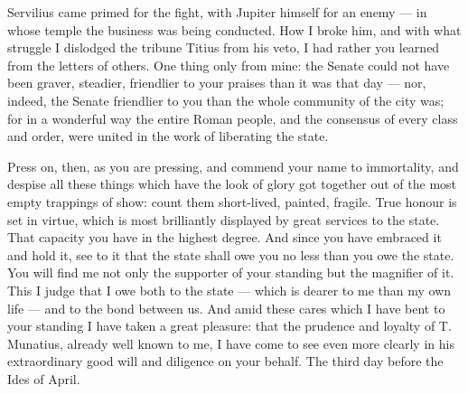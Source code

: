  Servilius came primed for the fight, with Jupiter himself for an enemy --- in whose temple the business was being conducted. How I broke him, and with what struggle I dislodged the tribune Titius from his veto, I had rather you learned from the letters of others. One thing only from mine: the Senate could not have been graver, steadier, friendlier to your praises than it was that day --- nor, indeed, the Senate friendlier to you than the whole community of the city was; for in a wonderful way the entire Roman people, and the consensus of every class and order, were united in the work of liberating the state.

 Press on, then, as you are pressing, and commend your name to immortality, and despise all these things which have the look of glory got together out of the most empty trappings of show: count them short-lived, painted, fragile. True honour is set in virtue, which is most brilliantly displayed by great services to the state. That capacity you have in the highest degree. And since you have embraced it and hold it, see to it that the state shall owe you no less than you owe the state. You will find me not only the supporter of your standing but the magnifier of it. This I judge that I owe both to the state --- which is dearer to me than my own life --- and to the bond between us. And amid these cares which I have bent to your standing I have taken a great pleasure: that the prudence and loyalty of T. Munatius, already well known to me, I have come to see even more clearly in his extraordinary good will and diligence on your behalf. The third day before the Ides of April.
